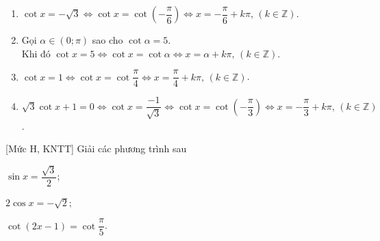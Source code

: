 \begin{bt}
{\begin{enumerate}
			\item $\cot x=-\sqrt{3}\Leftrightarrow\cot x=\cot\left(-\dfrac{\pi}{6}\right)\Leftrightarrow x=-\dfrac{\pi}{6}+k\pi,\,(k\in\mathbb{Z})$.
			\item Gọi $\alpha\in\left(0;\pi\right)$ sao cho $\cot\alpha=5$.\\Khi đó $\cot x=5\Leftrightarrow\cot x=\cot\alpha\Leftrightarrow x=\alpha+k\pi,\,(k\in\mathbb{Z})$.
			\item $\cot x=1\Leftrightarrow\cot x=\cot\dfrac{\pi}{4}\Leftrightarrow x=\dfrac{\pi}{4}+k\pi,\,(k\in\mathbb{Z})$.
			\item $\sqrt{3}\cot x+1=0\Leftrightarrow\cot x=\dfrac{-1}{\sqrt{3}}\Leftrightarrow\cot x=\cot\left(-\dfrac{\pi}{3}\right)\Leftrightarrow x=-\dfrac{\pi}{3}+k\pi,\,(k\in\mathbb{Z})$.
	\end{enumerate}}
\end{bt}

\begin{bt}%
[Mức H, KNTT]%
	Giải các phương trình sau
	\begin{listEX}[3]
		\item $\sin x=\dfrac{\sqrt{3}}{2}$;
		\item $2\cos x=-\sqrt{2}$;
		\item $\cot(2x-1)=\cot\dfrac{\pi}{5}$.
	\end{listEX}
\end{bt}

